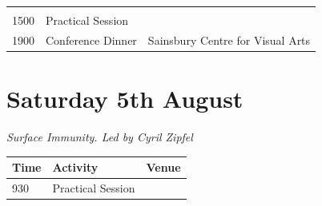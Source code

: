 \documentclass[12pt,]{book}
\begin{document}
\begin{longtable}[]{@{}lll@{}}
\begin{minipage}[t]{0.35\columnwidth}
\strut
\end{minipage}\tabularnewline
\begin{minipage}[t]{0.09\columnwidth}\raggedright\strut
1500\strut
\end{minipage} & \begin{minipage}[t]{0.35\columnwidth}\raggedright\strut
Practical Session\strut
\end{minipage} & \begin{minipage}[t]{0.35\columnwidth}\raggedright\strut
\strut
\end{minipage}\tabularnewline
\begin{minipage}[t]{0.09\columnwidth}\raggedright\strut
1900\strut
\end{minipage} & \begin{minipage}[t]{0.35\columnwidth}\raggedright\strut
Conference Dinner\strut
\end{minipage} & \begin{minipage}[t]{0.35\columnwidth}\raggedright\strut
Sainsbury Centre for Visual Arts\strut
\end{minipage}\tabularnewline
\bottomrule
\end{longtable}

\section*{Saturday 5th August}\label{saturday-5th-august}

\emph{Surface Immunity. Led by Cyril Zipfel}

\begin{longtable}[]{@{}lll@{}}
\toprule
\begin{minipage}[b]{0.09\columnwidth}\raggedright\strut
Time\strut
\end{minipage} & \begin{minipage}[b]{0.23\columnwidth}\raggedright\strut
Activity\strut
\end{minipage} & \begin{minipage}[b]{0.09\columnwidth}\raggedright\strut
Venue\strut
\end{minipage}\tabularnewline
\midrule
\endhead
\begin{minipage}[t]{0.09\columnwidth}\raggedright\strut
930\strut
\end{minipage} & \begin{minipage}[t]{0.23\columnwidth}\raggedright\strut
Practical Session\strut
\end{minipage} & \begin{minipage}[t]{0.09\columnwidth}\raggedright\strut
\strut
\end{minipage}\tabularnewline
\bottomrule
\end{longtable}
\end{document}
